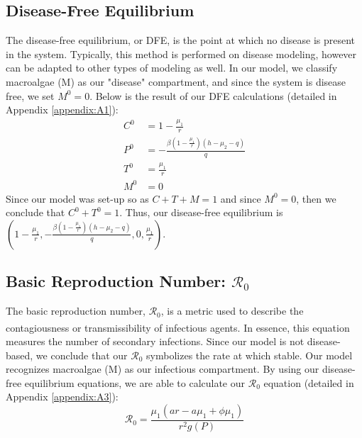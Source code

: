 \documentclass[12pt]{article}
\begin{document}
\subsection{Disease-Free Equilibrium}
The disease-free equilibrium, or DFE, is the point at which no disease is present in the system. Typically, this method is performed on disease modeling, however can be adapted to other types of modeling as well. In our model, we classify macroalgae (M) as our "disease" compartment, and since the system is disease free, we set $M^{0} = 0$. Below is the result of our DFE calculations (detailed in Appendix \ref{appendix:A1}):
\begin{align}
        C^{0} &= 1 - \frac{\mu_{1}}{r} \label{eq:C0}\\
        P^{0} &= -\frac{\beta(1 - \frac{\mu_{1}}{r})(h - \mu_{2} - q)}{q} \label{eq:P0}\\
        T^{0} &= \frac{\mu_{1}}{r} \label{eq:T0}\\
        M^{0} &= 0 \label{eq:M0}
\end{align}
Since our model was set-up so as $C+T+M=1$ and since $M^{0} = 0$, then we conclude that $C^{0} + T^{0} = 1$. Thus, our disease-free equilibrium is $(1 - \frac{\mu_{1}}{r}, -\frac{\beta(1 - \frac{\mu_{1}}{r})(h - \mu_{2} - q)}{q}, 0, \frac{\mu_{1}}{r})$.

\subsection{Basic Reproduction Number: $\mathscr{R}_{0}$}
The basic reproduction number, $\mathscr{R}_{0}$, is a metric used to describe the contagiousness or transmissibility of infectious agents\textsuperscript{\cite{delamater_street_leslie_yang_jacobsen_2019}}. In essence, this equation measures the number of secondary infections. Since our model is not disease-based, we conclude that our $\mathscr{R}_{0}$ symbolizes the rate at which stable. Our model recognizes macroalgae (M) as our infectious compartment. By using our disease-free equilibrium equations, we are able to calculate our $\mathscr{R}_{0}$ equation (detailed in Appendix \ref{appendix:A3}): 
\begin{equation}\label{eq:R0}
    \displaystyle {\mathscr{R}}_{0} = \frac{\mu_{1}(a r - a\mu_{1} + \phi \mu_{1})}{r^{2}g(P)}
\end{equation}
\end{document}
